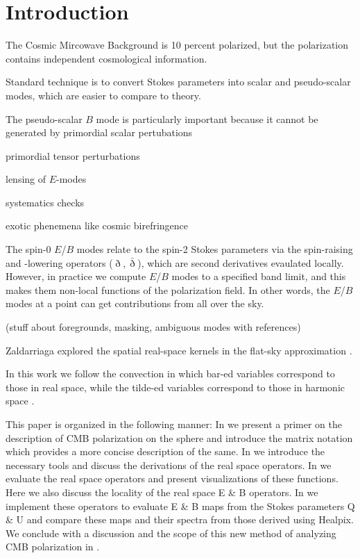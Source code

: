 \section{Introduction}
The Cosmic Mircowave Background is 10 percent polarized, but the polarization contains independent cosmological information.

Standard technique is to convert Stokes parameters into scalar and pseudo-scalar modes, which are easier to compare to theory.

The pseudo-scalar $B$ mode is particularly important because it cannot be generated by primordial scalar pertubations

primordial tensor perturbations

lensing of $E$-modes

systematics checks

exotic phenemena like cosmic birefringence

The spin-0 $E$/$B$ modes relate to the spin-2 Stokes parameters via the spin-raising and -lowering operators ($\eth,\bar \eth$), which are second derivatives evaulated locally.  However, in practice we compute $E$/$B$ modes to a specified band limit, and this makes them non-local functions of the polarization field.  In other words, the $E$/$B$ modes at a point can get contributions from all over the sky.

(stuff about foregrounds, masking, ambiguous modes with references)

Zaldarriaga explored the spatial real-space kernels in the flat-sky approximation \citep{}.

In this work we follow the convection in which bar-ed variables correspond to those in real space, while the tilde-ed variables correspond to those in harmonic space \cite{Zaldarriaga2001a}. 

This paper is organized in the following manner: In  we present a primer on the description of CMB polarization on the sphere and introduce the matrix notation which provides a more concise description of the same. In  we introduce the necessary tools  and discuss the derivations of the real space operators. In  we evaluate the real space operators and present visualizations of these functions. Here we also discuss the locality of the real space E \& B operators. In  we implement these operators to evaluate E \& B  maps from the Stokes parameters Q \& U and compare these maps and their spectra from those derived using Healpix. We conclude with a discussion and the scope of this new method of analyzing CMB polarization in .
